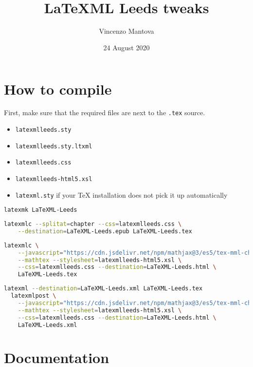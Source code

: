\documentclass[a4paper]{article}
\title{LaTeXML Leeds tweaks}
\author{Vincenzo Mantova}
\date{24 August 2020}
\theoremstyle{definition}
\begin{document}
\maketitle

\tableofcontents

\section{How to compile}
First, make sure that the required files are next to the \verb|.tex| source.
\begin{itemize}
  \item \verb|latexmlleeds.sty|
  \item \verb|latexmlleeds.sty.ltxml|
  \item \verb|latexmlleeds.css|
  \item \verb|latexmlleeds-html5.xsl|
  \item \verb|latexml.sty| if your \TeX{} installation does not pick it up automatically
\end{itemize}

\begin{lstlisting}[language=bash,caption={Generate the PDF}]
  latexmk LaTeXML-Leeds
\end{lstlisting}
\begin{lstlisting}[language=bash,caption={Generate the EPUB}]
  latexmlc --splitat=chapter --css=latexmlleeds.css \
    --destination=LaTeXML-Leeds.epub LaTeXML-Leeds.tex
\end{lstlisting}
\begin{lstlisting}[language=bash,caption={Generate the HTML}]
  latexmlc \
    --javascript="https://cdn.jsdelivr.net/npm/mathjax@3/es5/tex-mml-chtml.js" \
    --mathtex --stylesheet=latexmlleeds-html5.xsl \
    --css=latexmlleeds.css --destination=LaTeXML-Leeds.html \
    LaTeXML-Leeds.tex
\end{lstlisting}
\begin{lstlisting}[language=bash,caption={Generate the HTML in two steps}]
  latexml --destination=LaTeXML-Leeds.xml LaTeXML-Leeds.tex
  latexmlpost \
    --javascript="https://cdn.jsdelivr.net/npm/mathjax@3/es5/tex-mml-chtml.js"\
    --mathtex --stylesheet=latexmlleeds-html5.xsl \
    --css=latexmlleeds.css --destination=LaTeXML-Leeds.html \
    LaTeXML-Leeds.xml
\end{lstlisting}

\section{Documentation}
\end{document}
